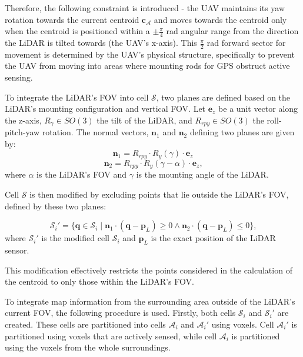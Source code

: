             Therefore, the following constraint is introduced - the \ac{UAV} maintains its yaw rotation towards the current centroid $\mathbf{c}_{\mathcal{A}}$ and moves towards the centroid only when the centroid is positioned within a $\pm \frac{\pi}{4}$ rad angular range from the direction the \ac{LiDAR} is tilted towards (the \ac{UAV}'s x-axis).
            This $\frac{\pi}{2}$ rad forward sector for movement is determined by the \ac{UAV}'s physical structure, specifically to prevent the \ac{UAV} from moving into areas where mounting rods for GPS obstruct active sensing.

            To integrate the \ac{LiDAR}'s \ac{FOV} into cell $\mathcal{S}$, two planes are defined based on the \ac{LiDAR}'s mounting configuration and vertical \ac{FOV}.
            Let $\mathbf{e}_z$ be a unit vector along the z-axis, $R_{\gamma} \in SO(3)$ the tilt of the \ac{LiDAR}, and $R_{rpy} \in SO(3)$ the roll-pitch-yaw rotation.
            The normal vectors, $\mathbf{n}_1$ and $\mathbf{n}_2$ defining two planes are given by:
            \begin{equation}
                \mathbf{n}_1 = R_{rpy} \cdot R_{y}(\gamma) \cdot \mathbf{e}_z    
            \end{equation}
            \begin{equation}
                \mathbf{n}_2 = R_{rpy} \cdot R_{y}(\gamma - \alpha) \cdot \mathbf{e}_z  \text{,}
            \end{equation}
            where $\alpha$ is the \ac{LiDAR}'s \ac{FOV} and $\gamma$ is the mounting angle of the \ac{LiDAR}.

            Cell $\mathcal{S}$ is then modified by excluding points that lie outside the \ac{LiDAR}'s \ac{FOV}, defined by these two planes: 

            \begin{equation}
                \mathcal{S}_i' = \{ \mathbf{q} \in \mathcal{S}_i \mid \mathbf{n}_1 \cdot (\mathbf{q} - \mathbf{p}_{L}) \geq 0 \land \mathbf{n}_2 \cdot (\mathbf{q} - \mathbf{p}_{L}) \leq 0 \}\text{,}
            \end{equation}
            where $\mathcal{S}_i'$ is the modified cell $\mathcal{S}_i$ and $\mathbf{p}_{L}$ is the exact position of the LiDAR sensor.

            This modification effectively restricts the points considered in the calculation of the centroid to only those within the \ac{LiDAR}'s \ac{FOV}.

            To integrate map information from the surrounding area outside of the \ac{LiDAR}'s current \ac{FOV}, the following procedure is used.
            Firstly, both cells $\mathcal{S}_i$ and $\mathcal{S}_i'$ are created. These cells are partitioned into cells $\mathcal{A}_i$ and $\mathcal{A}_i'$ using voxels. 
            Cell $\mathcal{A}_i'$ is partitioned using voxels that are actively sensed, while cell $\mathcal{A}_i$ is partitioned using the voxels from the whole surroundings.

